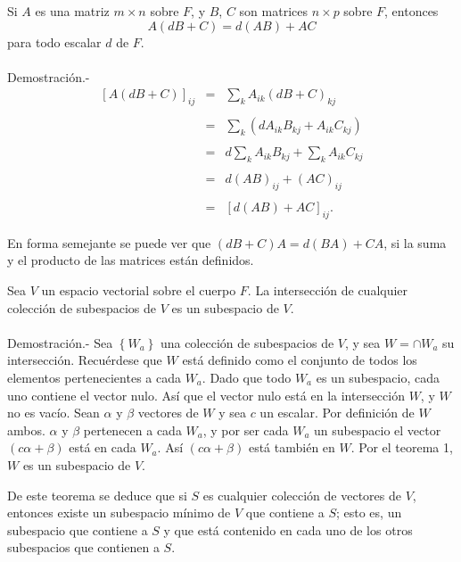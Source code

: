 \begin{lema}
    Si $A$ es una matriz $m\times n$ sobre $F$, y $B$, $C$ son matrices $n\times p$ sobre $F$, entonces
    \begin{equation}
	A(dB+C)=d(AB)+AC
    \end{equation}
    para todo escalar $d$ de $F$.\\\\
	Demostración.-\;
	$$
	\begin{array}{rcl}
	    \left[A(dB+C)\right]_{ij}&=&\displaystyle\sum_k A_{ik}(dB+C)_{kj}\\\\
				     &=&\displaystyle\sum_k \left(dA_{ik}B_{kj}+A_{ik}C_{kj}\right)\\\\
				     &=& d\displaystyle\sum_k A_{ik}B_{kj} + \sum_{k} A_{ik} C_{kj}\\\\
				     &=& d(AB)_{ij} + (AC)_{ij}\\\\
				     &=& \left[d(AB) + AC\right]_{ij}.
	\end{array}
	$$
\end{lema}

En forma semejante se puede ver que $(dB+C)A=d(BA)+CA$, si la suma y el producto de las matrices están definidos.

\begin{teo}
    Sea $V$ un espacio vectorial sobre el cuerpo $F$. La intersección de cualquier colección de subespacios de $V$ es un subespacio de $V$.\\\\
	Demostración.-\; Sea $\left\{W_a\right\}$ una colección de subespacios de $V$, y sea $W=\cap W_a$ su intersección. Recuérdese que $W$ está definido como el conjunto de todos los elementos pertenecientes a cada $W_a$. Dado que todo $W_a$ es un subespacio, cada uno contiene el vector nulo. Así que el vector nulo está en la intersección $W$, y $W$ no es vacío. Sean $\alpha$ y $\beta$ vectores de $W$ y sea $c$ un escalar. Por definición de $W$ ambos. $\alpha$ y $\beta$ pertenecen a cada $W_a$, y por ser cada $W_a$ un subespacio el vector $(c\alpha+\beta)$ está en cada $W_a$. Así $(c\alpha+\beta)$ está también en $W$. Por el teorema 1, $W$ es un subespacio de $V$. 
\end{teo}

De este teorema se deduce que si $S$ es cualquier colección de vectores de $V$, entonces existe un subespacio mínimo de $V$ que contiene a $S$; esto es, un subespacio que contiene a $S$ y que está contenido en cada uno de los otros subespacios que contienen a $S$.


